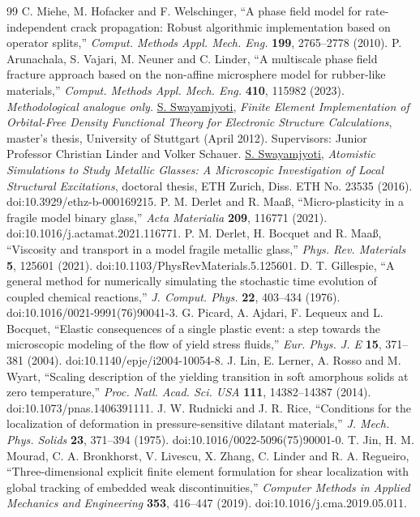 \documentclass[11pt,a4paper]{article}
\begin{document}
\begin{thebibliography}{99}
 C. Miehe, M. Hofacker and F. Welschinger, ``A phase field model for rate-independent crack propagation: Robust algorithmic implementation based on operator splits,'' \emph{Comput. Methods Appl. Mech. Eng.} \textbf{199}, 2765--2778 (2010).
 P. Arunachala, S. Vajari, M. Neuner and C. Linder, ``A multiscale phase field fracture approach based on the non-affine microsphere model for rubber-like materials,'' \emph{Comput. Methods Appl. Mech. Eng.} \textbf{410}, 115982 (2023). \emph{Methodological analogue only.}
 \underline{S. Swayamjyoti}, \emph{Finite Element Implementation of Orbital-Free Density Functional Theory for Electronic Structure Calculations}, master's thesis, University of Stuttgart (April 2012). Supervisors: Junior Professor Christian Linder and Volker Schauer.
 \underline{S. Swayamjyoti}, \emph{Atomistic Simulations to Study Metallic Glasses: A Microscopic Investigation of Local Structural Excitations}, doctoral thesis, ETH Zurich, Diss. ETH No. 23535 (2016). doi:10.3929/ethz-b-000169215.
 P. M. Derlet and R. Maa\ss{}, ``Micro-plasticity in a fragile model binary glass,'' \emph{Acta Materialia} \textbf{209}, 116771 (2021). doi:10.1016/j.actamat.2021.116771.
 P. M. Derlet, H. Bocquet and R. Maa\ss{}, ``Viscosity and transport in a model fragile metallic glass,'' \emph{Phys. Rev. Materials} \textbf{5}, 125601 (2021). doi:10.1103/PhysRevMaterials.5.125601.
 D. T. Gillespie, ``A general method for numerically simulating the stochastic time evolution of coupled chemical reactions,'' \emph{J. Comput. Phys.} \textbf{22}, 403--434 (1976). doi:10.1016/0021-9991(76)90041-3.
 G. Picard, A. Ajdari, F. Lequeux and L. Bocquet, ``Elastic consequences of a single plastic event: a step towards the microscopic modeling of the flow of yield stress fluids,'' \emph{Eur. Phys. J. E} \textbf{15}, 371--381 (2004). doi:10.1140/epje/i2004-10054-8.
 J. Lin, E. Lerner, A. Rosso and M. Wyart, ``Scaling description of the yielding transition in soft amorphous solids at zero temperature,'' \emph{Proc. Natl. Acad. Sci. USA} \textbf{111}, 14382--14387 (2014). doi:10.1073/pnas.1406391111.
 J. W. Rudnicki and J. R. Rice, ``Conditions for the localization of deformation in pressure-sensitive dilatant materials,'' \emph{J. Mech. Phys. Solids} \textbf{23}, 371--394 (1975). doi:10.1016/0022-5096(75)90001-0.
 T. Jin, H. M. Mourad, C. A. Bronkhorst, V. Livescu, X. Zhang, C. Linder and R. A. Regueiro, ``Three-dimensional explicit finite element formulation for shear localization with global tracking of embedded weak discontinuities,'' \emph{Computer Methods in Applied Mechanics and Engineering} \textbf{353}, 416--447 (2019). doi:10.1016/j.cma.2019.05.011.

\end{thebibliography}
\end{document}
